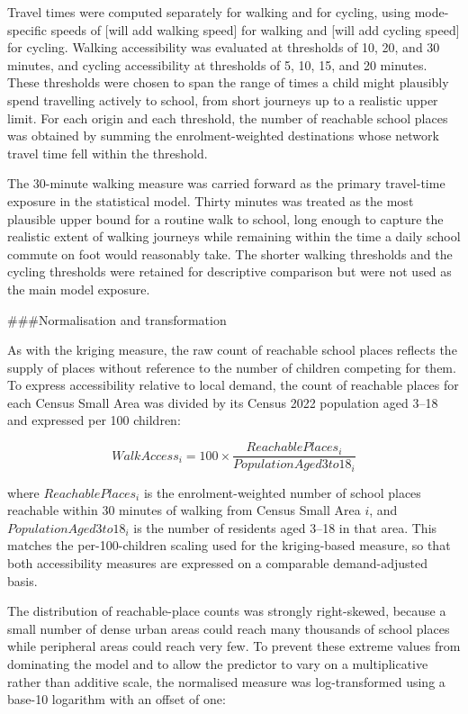 \documentclass{article}
\begin{document}
Travel times were computed separately for walking and for cycling, using
mode-specific speeds of {[}will add walking speed{]} for walking and
{[}will add cycling speed{]} for cycling. Walking accessibility was
evaluated at thresholds of 10, 20, and 30 minutes, and cycling
accessibility at thresholds of 5, 10, 15, and 20 minutes. These
thresholds were chosen to span the range of times a child might
plausibly spend travelling actively to school, from short journeys up to
a realistic upper limit. For each origin and each threshold, the number
of reachable school places was obtained by summing the
enrolment-weighted destinations whose network travel time fell within
the threshold.

The 30-minute walking measure was carried forward as the primary
travel-time exposure in the statistical model. Thirty minutes was
treated as the most plausible upper bound for a routine walk to school,
long enough to capture the realistic extent of walking journeys while
remaining within the time a daily school commute on foot would
reasonably take. The shorter walking thresholds and the cycling
thresholds were retained for descriptive comparison but were not used as
the main model exposure.

\#\#\#Normalisation and transformation

As with the kriging measure, the raw count of reachable school places
reflects the supply of places without reference to the number of
children competing for them. To express accessibility relative to local
demand, the count of reachable places for each Census Small Area was
divided by its Census 2022 population aged 3--18 and expressed per 100
children:

\[
WalkAccess_i = 100 \times \frac{ReachablePlaces_i}{PopulationAged3to18_i}
\]

where \(ReachablePlaces_i\) is the enrolment-weighted number of school
places reachable within 30 minutes of walking from Census Small Area
\(i\), and \(PopulationAged3to18_i\) is the number of residents aged
3--18 in that area. This matches the per-100-children scaling used for
the kriging-based measure, so that both accessibility measures are
expressed on a comparable demand-adjusted basis.

The distribution of reachable-place counts was strongly right-skewed,
because a small number of dense urban areas could reach many thousands
of school places while peripheral areas could reach very few. To prevent
these extreme values from dominating the model and to allow the
predictor to vary on a multiplicative rather than additive scale, the
normalised measure was log-transformed using a base-10 logarithm with an
offset of one:
\end{document}
